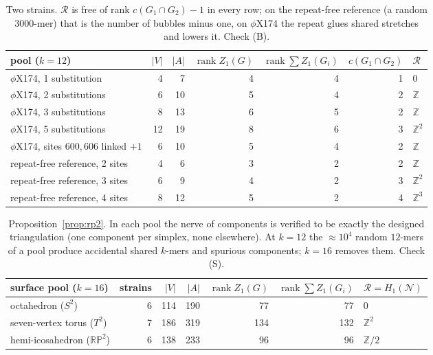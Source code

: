\documentclass[11pt]{article}
\theoremstyle{plain}
\theoremstyle{definition}
\theoremstyle{remark}
\newcommand{\Z}{\mathbb{Z}}
\newcommand{\rank}{\operatorname{rank}}
\newcommand{\Rec}{\mathcal{R}}
\newcommand{\Nerve}{\mathcal{N}}
\newcommand{\RP}{\mathbb{RP}^2}
\begin{document}
\begin{table}[t]
\centering
\small
\begin{tabular}{lrrrrrl}
\toprule
pool ($k=12$) & $|V|$ & $|A|$ & $\rank Z_1(G)$ & $\rank\sum Z_1(G_i)$ & $c(G_1\cap G_2)$ & $\Rec$\\
\midrule
$\phi$X174, 1 substitution          &  4 &  7 & 4 & 4 & 1 & $0$\\
$\phi$X174, 2 substitutions         &  6 & 10 & 5 & 4 & 2 & $\Z$\\
$\phi$X174, 3 substitutions         &  8 & 13 & 6 & 5 & 2 & $\Z$\\
$\phi$X174, 5 substitutions         & 12 & 19 & 8 & 6 & 3 & $\Z^2$\\
$\phi$X174, sites $600,606$ linked $+1$ & 6 & 10 & 5 & 4 & 2 & $\Z$\\
repeat-free reference, 2 sites      &  4 &  6 & 3 & 2 & 2 & $\Z$\\
repeat-free reference, 3 sites      &  6 &  9 & 4 & 2 & 3 & $\Z^2$\\
repeat-free reference, 4 sites      &  8 & 12 & 5 & 2 & 4 & $\Z^3$\\
\bottomrule
\end{tabular}
\caption{Two strains. $\Rec$ is free of rank $c(G_1\cap G_2)-1$ in every row; on the
repeat-free reference (a random $3000$-mer) that is the number of bubbles minus one, on
$\phi$X174 the repeat glues shared stretches and lowers it. Check (B).}
\label{tab:two}
\end{table}

\begin{table}[t]
\centering
\small
\begin{tabular}{lrrrrrl}
\toprule
surface pool ($k=16$) & strains & $|V|$ & $|A|$ & $\rank Z_1(G)$ & $\rank\sum Z_1(G_i)$ & $\Rec=H_1(\Nerve)$\\
\midrule
octahedron ($S^2$)               & 6 & 114 & 190 &  77 &  77 & $0$\\
seven-vertex torus ($T^2$)       & 7 & 186 & 319 & 134 & 132 & $\Z^2$\\
hemi-icosahedron ($\RP$)         & 6 & 138 & 233 &  96 &  96 & $\Z/2$\\
\bottomrule
\end{tabular}
\caption{Proposition~\ref{prop:rp2}. In each pool the nerve of components is verified to be
exactly the designed triangulation (one component per simplex, none elsewhere). At $k=12$
the $\approx10^4$ random $12$-mers of a pool produce accidental shared $k$-mers and spurious
components; $k=16$ removes them. Check (S).}
\label{tab:surfaces}
\end{table}
\end{document}
